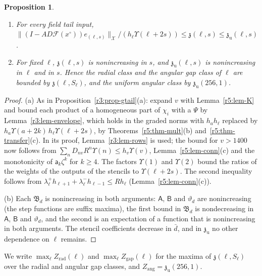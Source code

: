 \documentclass[11pt]{amsart}
\newtheorem{proposition}[theorem]{Proposition}
\theoremstyle{definition}
\theoremstyle{remark}
\numberwithin{equation}{section}
\newcommand{\Fc}{\mathcal{F}}
\newcommand{\nrm}[1]{\lVert #1\rVert}
\begin{document}
\begin{proposition}\label{r5:prop-gtail}
\begin{enumerate}[label=\textup{(\alph*)}]
\item For every field tail input, $\nrm{(I-AD\Fc(x^\circ))e_{(\ell,s)}}_{\mathcal X}/(h_\ell\Upsilon(\ell+2s))\leq\mathfrak z(\ell,s)\leq\mathfrak z_{\mathrm u}(\ell,s)$.
\item For fixed $\ell$, $\mathfrak z(\ell,s)$ is nonincreasing in $s$, and $\mathfrak z_{\mathrm u}(\ell,s)$ is nonincreasing in $\ell$ and in $s$. Hence the radial class and the angular gap class of $\ell$ are bounded by $\mathfrak z(\ell,S_\ell)$, and the uniform angular class by $\mathfrak z_{\mathrm u}(256,1)$.
\end{enumerate}
\end{proposition}

\begin{proof}
(a) As in Proposition~\ref{r3:prop-gtail}(a): expand $v$ with Lemma~\ref{r5:lem-K} and bound each product of a homogeneous part of $\chi_i$ with a $\Psi$ by Lemma~\ref{r3:lem-envelope}, which holds in the graded norms with $h_ah_\ell$ replaced by $h_a\Upsilon(a+2k)\,h_\ell\Upsilon(\ell+2s)$, by Theorems~\ref{r5:thm-mult}(b) and~\ref{r5:thm-transfer}(c). In its proof, Lemma~\ref{r3:lem-rows} is used; the bound for $v>1400$ now follows from $\sum_nD_{nv}R^n\Upsilon(n)\leq h_v\Upsilon(v)$, Lemma~\ref{r5:lem-conn}(c) and the monotonicity of $\mathsf a_k\zeta^k$ for $k\geq4$. The factors $\Upsilon(1)$ and $\Upsilon(2)$ bound the ratios of the weights of the outputs of the stencils to $\Upsilon(\ell+2s)$. The second inequality follows from $\lambda^+_\ell h_{\ell+1}+\lambda^-_\ell h_{\ell-1}\leq Rh_\ell$ (Lemma~\ref{r5:lem-conn}(c)).

(b) Each $\mathfrak B_d$ is nonincreasing in both arguments: $\mathsf A$, $\mathsf B$ and $\vartheta_d$ are nonincreasing (the step functions are suffix maxima), the first bound in $\mathfrak B_d$ is nondecreasing in $\mathsf A$, $\mathsf B$ and $\vartheta_d$, and the second is an expectation of a function that is nonincreasing in both arguments. The stencil coefficients decrease in $\bar d$, and in $\mathfrak z_{\mathrm u}$ no other dependence on $\ell$ remains.
\end{proof}

We write $\max_\ell Z_{\mathrm{rad}}(\ell)$ and $\max_\ell Z_{\mathrm{gap}}(\ell)$ for the maxima of $\mathfrak z(\ell,S_\ell)$ over the radial and angular gap classes, and $Z_{\mathrm{ang}}=\mathfrak z_{\mathrm u}(256,1)$.
\end{document}
